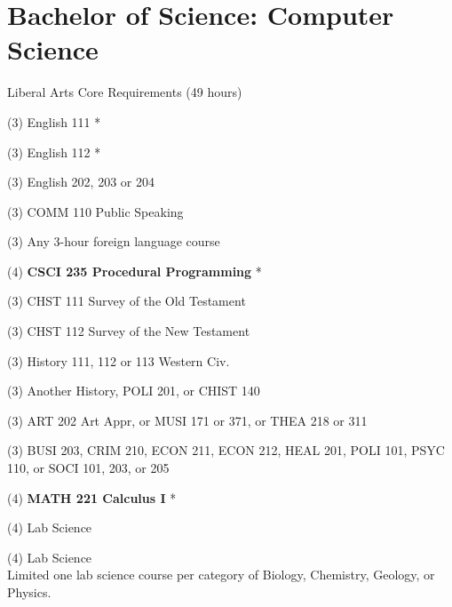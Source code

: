 %
\section*{Bachelor of Science: Computer Science}

\begin{reqgroup}{Liberal Arts Core Requirements (49 hours)}
\begin{checklist}
\begin{minipage}[t]{0.5\linewidth}
	\item (3) English 111 *
	\item (3) English 112 *
	\item (3) English 202, 203 or 204
	\item (3) COMM 110 Public Speaking
	\item (3) Any 3-hour foreign language course
	\item (4) \textbf{CSCI 235  Procedural Programming} *
	\item (3) CHST 111  Survey of the Old Testament
	\item (3) CHST 112  Survey of the New Testament
	\item (3) History 111, 112 or 113 Western Civ.
\end{minipage}
\begin{minipage}[t]{0.5\linewidth}
	\item (3)	Another History, POLI 201, or CHIST 140
	\item (3)	ART 202 Art Appr, or MUSI 171 or 371, or THEA 218 or 311
	\item (3)	BUSI 203, CRIM 210, ECON 211, ECON 212, HEAL 201, POLI 101, PSYC 110, or SOCI 101, 203, or 205
	\item (4)	\textbf{MATH 221 Calculus I} *
	\item (4)	 Lab Science
	\item (4)	 Lab Science\\Limited one lab science course per category of Biology, Chemistry,
Geology, or Physics.
\end{minipage}
\end{checklist}
\end{reqgroup}


